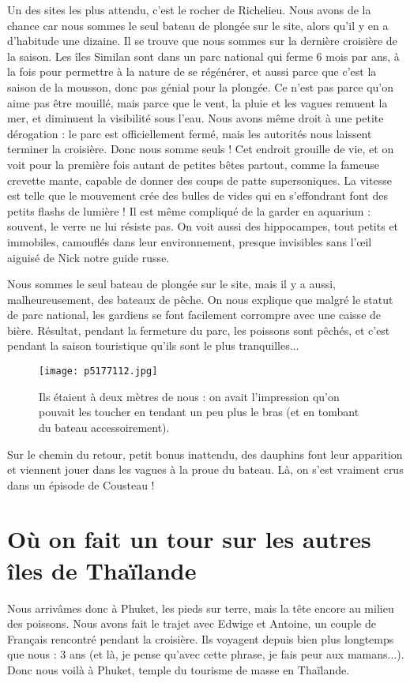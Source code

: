 \documentclass{book}
\begin{document}
Un des sites les plus attendu, c'est le rocher de Richelieu. Nous avons de la chance car nous sommes le seul bateau de plongée sur le site, alors qu'il y en a d'habitude une dizaine. Il se trouve que nous sommes sur la dernière croisière de la saison. Les îles Similan sont dans un parc national qui ferme 6 mois par ans, à la fois pour permettre à la nature de se régénérer, et aussi parce que c'est la saison de la mousson, donc pas génial pour la plongée. Ce n'est pas parce qu'on aime pas être mouillé, mais parce que le vent, la pluie et les vagues remuent la mer, et diminuent la visibilité sous l'eau. Nous avons même droit à une petite dérogation : le parc est officiellement fermé, mais les autorités nous laissent terminer la croisière. Donc nous somme seuls ! Cet endroit grouille de vie, et on voit pour la première fois autant de petites bêtes partout, comme la fameuse crevette mante, capable de donner des coups de patte supersoniques. La vitesse est telle que le mouvement crée des bulles de vides qui en s'effondrant font des petits flashs de lumière ! Il est même compliqué de la garder en aquarium : souvent, le verre ne lui résiste pas. On voit aussi des hippocampes, tout petits et immobiles, camouflés dans leur environnement, presque invisibles sans l’œil aiguisé de Nick notre guide russe.


Nous sommes le seul bateau de plongée sur le site, mais il y a aussi, malheureusement, des bateaux de pêche. On nous explique que malgré le statut de parc national, les gardiens se font facilement corrompre avec une caisse de bière. Résultat, pendant la fermeture du parc, les poissons sont pêchés, et c'est pendant la saison touristique qu'ils sont le plus tranquilles...


\begin{figure}[h]
\centering
\texttt{[image: p5177112.jpg]}
\caption*{Ils étaient à deux mètres de nous : on avait l'impression qu'on pouvait les toucher en tendant un peu plus le bras (et en tombant du bateau accessoirement).}
\end{figure}

Sur le chemin du retour, petit bonus inattendu, des dauphins font leur apparition et viennent jouer dans les vagues à la proue du bateau. Là, on s'est vraiment crus dans un épisode de Cousteau !



\chapter{Où on fait un tour sur les autres îles de Thaïlande}
Nous arrivâmes donc à Phuket, les pieds sur terre, mais la tête encore au milieu des poissons. Nous avons fait le trajet avec Edwige et Antoine, un couple de Français rencontré pendant la croisière. Ils voyagent depuis bien plus longtemps que nous : 3 ans (et là, je pense qu'avec cette phrase, je fais peur aux mamans...). Donc nous voilà à Phuket, temple du tourisme de masse en Thaïlande.
\end{document}
